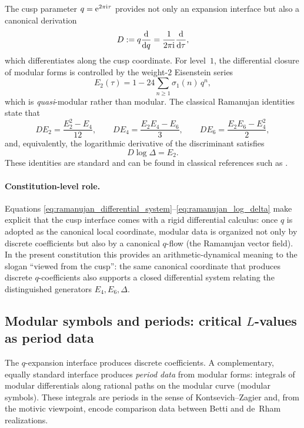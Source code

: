 The cusp parameter $q=\mathrm{e}^{2\pi\mathrm{i}\tau}$ provides not only an expansion interface but also a canonical derivation
\begin{equation}
D:=q\frac{\mathrm{d}}{\mathrm{d} q}=\frac{1}{2\pi\mathrm{i}}\frac{\mathrm{d}}{\mathrm{d}\tau},
\end{equation}
which differentiates along the cusp coordinate.
For level~$1$, the differential closure of modular forms is controlled by the weight-$2$ Eisenstein series
\begin{equation}
E_2(\tau)=1-24\sum_{n\ge 1}\sigma_1(n)\,q^n,
\end{equation}
which is \emph{quasi}-modular rather than modular.
The classical Ramanujan identities state that
\begin{equation}
DE_2=\frac{E_2^2-E_4}{12},\qquad
DE_4=\frac{E_2E_4-E_6}{3},\qquad
DE_6=\frac{E_2E_6-E_4^2}{2},
\label{eq:ramanujan_differential_system}
\end{equation}
and, equivalently, the logarithmic derivative of the discriminant satisfies
\begin{equation}
D\log \Delta = E_2.
\label{eq:ramanujan_log_delta}
\end{equation}
These identities are standard and can be found in classical references such as \cite{Serre1973,Apostol1990}.

\paragraph{Constitution-level role.}
Equations \eqref{eq:ramanujan_differential_system}--\eqref{eq:ramanujan_log_delta} make explicit that the cusp interface comes with a rigid differential calculus: once $q$ is adopted as the canonical local coordinate, modular data is organized not only by discrete coefficients but also by a canonical $q$-flow (the Ramanujan vector field).
In the present constitution this provides an arithmetic-dynamical meaning to the slogan ``viewed from the cusp'': the same canonical coordinate that produces discrete $q$-coefficients also supports a closed differential system relating the distinguished generators $E_4,E_6,\Delta$.

\subsection{Modular symbols and periods: critical \texorpdfstring{$L$}{L}-values as period data}
\label{sec:modular_periods_lvalues}

The $q$-expansion interface produces discrete coefficients. A complementary, equally standard interface produces \emph{period data} from modular forms: integrals of modular differentials along rational paths on the modular curve (modular symbols). These integrals are periods in the sense of Kontsevich--Zagier \cite{KontsevichZagier2001} and, from the motivic viewpoint, encode comparison data between Betti and de~Rham realizations.

